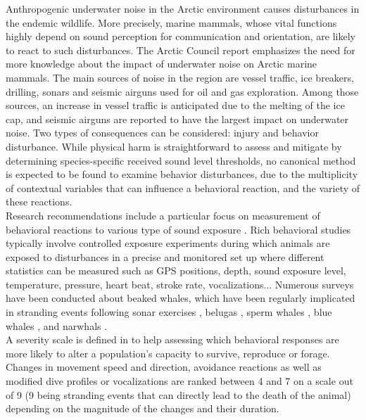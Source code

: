\documentclass[11pt]{article}
\newcommand {\1}{\mathbb{1}}
\theoremstyle{definition}
\theoremstyle{remark}
\theoremstyle{remark}
\begin{document}
Anthropogenic underwater noise in the Arctic environment causes disturbances in the endemic wildlife. More precisely, marine mammals, whose vital functions highly depend on sound perception for communication and orientation, are likely to react to such disturbances. The Arctic Council report \cite{halliday_underwater_2020} emphasizes the need for more knowledge about the impact of underwater noise on Arctic marine mammals. The main sources of noise in the region are vessel traffic, ice breakers, drilling, sonars and seismic airguns used for oil and gas exploration. Among those sources, an increase in vessel traffic is anticipated due to the melting of the ice cap, and seismic airguns are reported to have the largest impact on underwater noise. Two types of consequences can be considered: injury and behavior disturbance. While physical harm is straightforward to assess and mitigate by determining species-specific received sound level thresholds, no canonical method is expected to be found to examine behavior disturbances, due to the multiplicity of contextual variables that can influence a behavioral reaction, and the variety of these reactions.\\
Research recommendations include a particular focus on measurement of behavioral reactions to various type of sound exposure \cite{southall_marine_2008,southall_marine_2019}. Rich behavioral studies typically involve controlled exposure experiments during which animals are exposed to disturbances in a precise and monitored set up where different  statistics can be measured such as GPS positions, depth, sound exposure level, temperature, pressure, heart beat, stroke rate, vocalizations... Numerous surveys have been conducted about beaked whales, which have been regularly implicated in stranding events following sonar exercises \cite{tyack_beaked_2011,cioffi_trade-offs_2022}, belugas \cite{martin_exposure_2023}, sperm whales \cite{madsen_quantitative_2006}, blue whales \cite{friedlaender_preymediated_2016}, and narwhals \cite{heide-jorgensen_behavioral_2021,tervo_narwhals_2021}. \\
A severity scale is defined in \cite{southall_marine_2008} to help assessing which behavioral responses are more likely to alter a population's capacity to survive, reproduce or forage. Changes in movement speed and direction, avoidance reactions as well as modified dive profiles or vocalizations  are ranked between 4 and 7 on a scale out of 9 (9 being stranding events that can directly lead to the death of the animal) depending on the magnitude of the changes and their duration.\\
\end{document}
